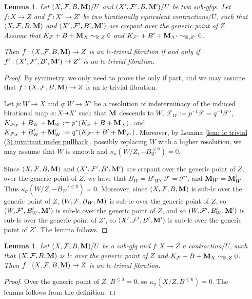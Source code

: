 \documentclass[11pt]{amsart}
\numberwithin{equation}{section}
\newcommand{\Mm}{{\bf{M}}}
\newcommand{\Ff}{\mathcal{F}}
\newtheorem{lem}[thm]{Lemma}
\theoremstyle{definition}
\theoremstyle{definition}
\theoremstyle{definition}
\begin{document}
\begin{lem}\label{lem: lc trivial preserved crepant}
    Let $(X,\Ff,B,\Mm)/U$ and $(X',\Ff',B,\Mm')/U$ be two sub-gfqs. Let $f: X\rightarrow Z$ and $f': X'\rightarrow Z'$ be two birationally equivalent contractions$/U$, such that $(X,\Ff,B,\Mm)$ and $(X',\Ff',B',\Mm')$ are crepant over the generic point of $Z$. Assume that $K_{\Ff}+B+\Mm_X\sim_{\mathbb R,Z}0$ and $K_{\Ff'}+B'+\Mm_{X'}\sim_{\mathbb R,Z'}0$.

    Then $f: (X,\Ff,B,\Mm)\rightarrow Z$ is an lc-trivial fibration if and only if $f': (X',\Ff',B',\Mm')\rightarrow Z'$ is an lc-trivial fibration.
\end{lem}
\begin{proof}
By symmetry, we only need to prove the only if part, and we may assume that $f: (X,\Ff,B,\Mm)\rightarrow Z$ is an lc-trivial fibration.

Let $p: W\rightarrow X$ and $q: W\rightarrow X'$ be a resolution of indeterminacy of the induced birational map $\phi: X\dashrightarrow X'$ such that $\Mm$ descends to $W$, $\Ff_W:=p^{-1}\Ff=q^{-1}\Ff'$,
$K_{\Ff_W}+B_W+\Mm_{W}:=p^*(K_{\Ff}+B+\Mm_X)$, and $K_{\Ff_W}+B'_W+\Mm'_{W}:=q^*(K_{\Ff'}+B'+\Mm'_{X'})$. Moreover, by Lemma \ref{lem: lc trivial (3) invariant under pullback}, possibly replacing $W$ with a higher resolution, we may assume that $W$ is smooth and $\kappa_{\sigma}(W/Z,-B_W^{\leq 0})=0$. 

Since $(X,\Ff,B,\Mm)$ and $(X',\Ff',B',\Mm')$ are crepant over the generic point of $Z$,  over the generic point of $Z$, we have that $B_W=B'_W$, $\Ff=\Ff'$, and $\Mm_W=\Mm'_W$. Thus $\kappa_{\sigma}(W/Z,-B_W'^{\leq 0})=0$. Moreover, since $(X,\Ff,B,\Mm)$ is sub-lc over the generic point of $Z$, $(W,\Ff,B_W,\Mm)$ is sub-lc over the generic point of $Z$, so $(W,\Ff',B_W',\Mm')$ is sub-lc over the generic point of $Z$, and so $(W,\Ff',B_W',\Mm')$ is sub-lc over the generic point of $Z'$, so $(X',\Ff',B',\Mm')$ is sub-lc over the generic point of $Z'$. The lemma follows.
\end{proof}

\begin{lem}\label{lem: lc trivial holds for lc gpair}
    Let $(X,\Ff,B,\Mm)/U$ be a sub-gfq and $f: X\rightarrow Z$ a contraction$/U$, such that $(X,\Ff,B,\Mm)$ is lc over the generic point of $Z$ and $K_{\Ff}+B+\Mm_X\sim_{\mathbb R,Z}0$. Then $f: (X,\Ff,B,\Mm)\rightarrow Z$ is an lc-trivial fibration.
\end{lem}
\begin{proof}
    Over the generic point of $Z$, $B^{\leq 0}=0$, so $\kappa_{\sigma}(X/Z,B^{\leq 0})=0$. The lemma follows from the definition.
\end{proof}
\end{document}
